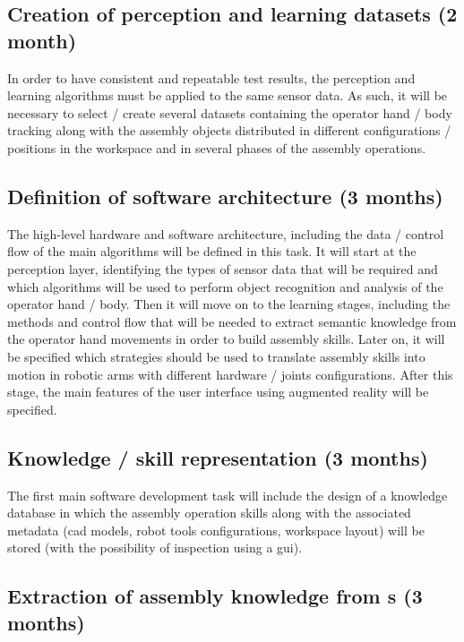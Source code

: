 \subsection{Creation of perception and learning datasets (2 month)}

In order to have consistent and repeatable test results, the perception and learning algorithms must be applied to the same sensor data. As such, it will be necessary to select / create several datasets containing the operator hand / body tracking along with the assembly objects distributed in different configurations / positions in the workspace and in several phases of the assembly operations.


\subsection{Definition of software architecture (3 months)}

The high-level hardware and software architecture, including the data / control flow of the main algorithms will be defined in this task. It will start at the perception layer, identifying the types of sensor data that will be required and which algorithms will be used to perform object recognition and analysis of the operator hand / body. Then it will move on to the learning stages, including the methods and control flow that will be needed to extract semantic knowledge from the operator hand movements in order to build assembly skills. Later on, it will be specified which strategies should be used to translate assembly skills into motion in robotic arms with different hardware / joints configurations. After this stage, the main features of the user interface using augmented reality will be specified.


\subsection{Knowledge / skill representation (3 months)}

The first main software development task will include the design of a knowledge database in which the assembly operation skills along with the associated metadata (\gls{cad} models, robot tools configurations, workspace layout) will be stored (with the possibility of inspection using a \gls{gui}).


\subsection{Extraction of assembly knowledge from s (3 months)}

